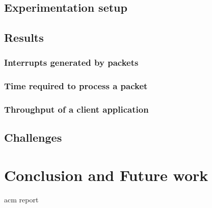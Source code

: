 \documentclass[a4paper,11pt]{report}
\begin{document}
\section{Experimentation setup}
\section{Results}
\subsection{Interrupts generated by packets}
\subsection{Time required to process a packet}
\subsection{Throughput of a client application}
\section{Challenges}

\chapter{Conclusion and Future work}

\newpage
 {acm}
 {report}
\end{document}
